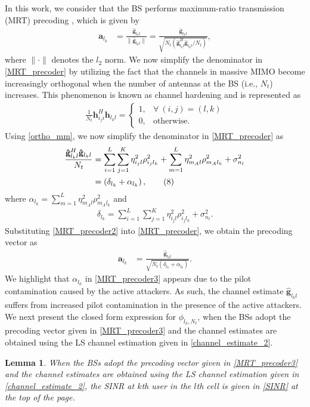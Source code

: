 \documentclass[conference]{IEEEtran}
\begin{document}
In this work, we consider that the BS performs maximum-ratio transmission (MRT) precoding \cite{Akbar16,Shen2015}, which is given by
\begin{align}\label{MRT_precoder}
\mathbf{a}_{l_{k}}&=\frac{\mathbf{\hat{g}}_{l_{k}l}}{\|\mathbf{\hat{g}}_{l_{k}l}\|}=
\frac{\mathbf{\hat{g}}_{l_{k}l}}{\sqrt{N_{t}
\left(\mathbf{\hat{g}}_{l_{k}l}^{H}\mathbf{\hat{g}}_{l_{k}l}/N_{t}\right)}}, \tag{6}
\end{align}
where $\|\cdot\|$ denotes the $l_2$ norm. We now simplify the denominator in \eqref{MRT_precoder} by utilizing the fact that the channels in massive MIMO become increasingly orthogonal when the number of antennas at the BS (i.e., $N_t$) increases. This phenomenon is known as channel hardening and is represented as
\begin{align}\label{ortho_mm}
\frac{1}{N_t}\mathbf{h}_{i_{j}i}^{H}\mathbf{h}_{l_{k}l}=
\begin{cases}
1, & \forall~(i,j)=(l,k)\\
0, & \text{otherwise.} \tag{7}
\end{cases}
\end{align}
Using \eqref{ortho_mm}, we now simplify the denominator in \eqref{MRT_precoder} as
\begin{align}\label{MRT_precoder2}
\frac{\mathbf{\hat{g}}_{l_{k}l}^{H}\mathbf{\hat{g}}_{l_{k}l}}{N_t} &= \sum_{i=1}^{L}\sum_{j=1}^{K}\eta_{i_{j}l}^2\rho_{i_{j}l_{k}}^{2}+\sum_{m=1}^L\eta_{m_{A}l}^2\rho_{m_{A}l_{k}}^{2}+\sigma_{n_{l}}^{2}  \notag \\
&=\left(\delta_{l_{k}}+\alpha_{l_{k}}\right), \tag{8}
\end{align}
where $\alpha_{l_{k}} = \sum_{m=1}^L \eta_{m_{A}l}^2\rho_{m_{A}l_{k}}^{2}$ and
\begin{align}\label{delta_original}
\delta_{l_{k}} = \sum_{i=1}^{L}\sum_{j=1}^{K}\eta_{i_{j}l}^2\rho_{i_{j}l_{k}}^{2}+\sigma_{n_{l}}^{2}. \tag{9}
\end{align}
Substituting \eqref{MRT_precoder2} into \eqref{MRT_precoder}, we obtain the precoding vector as
\begin{align}\label{MRT_precoder3}
\mathbf{a}_{l_{k}}&=
\frac{\mathbf{\hat{g}}_{l_{k}l}}{\sqrt{N_{t}
\left(\delta_{l_{k}}+\alpha_{l_{k}}\right)}}. \tag{10}
\end{align}
We highlight that $\alpha_{l_{k}}$ in \eqref{MRT_precoder3} appears due to the pilot contamination caused by the active attackers. As such, the channel estimate $\mathbf{\hat{g}}_{l_{k}l}$ suffers from increased pilot contamination in the presence of the active attackers. We next present the closed form expression for $\phi_{l_{k},N_{t}}$, when the BSs adopt the precoding vector given in \eqref{MRT_precoder3} and the channel estimates are obtained using the LS channel estimation given in \eqref{channel_estimate_2}.
\newtheorem{lemma}{Lemma}
\begin{lemma}\label{lemma_red}
When the BSs adopt the precoding vector given in \eqref{MRT_precoder3} and the channel estimates are obtained using the LS channel estimation given in \eqref{channel_estimate_2}, the SINR at $k$th user in the $l$th cell is given in \eqref{SINR} at the top of the page.
\end{lemma}
\end{document}
